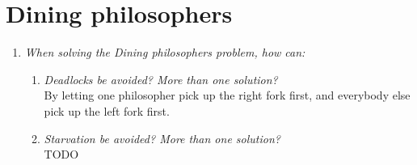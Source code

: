 \documentclass[a4paper]{article}
\begin{document}
\section{Dining philosophers}
\begin{enumerate}
  \item \textit{When solving the Dining philosophers problem, how can:} \\
    \begin{enumerate}
      \item \textit{Deadlocks be avoided? More than one solution?} \\
        By letting one philosopher pick up the right fork first, and everybody else pick up the left fork first.
      \item \textit{Starvation be avoided? More than one solution?} \\
        TODO
    \end{enumerate}
\end{enumerate}
\end{document}

